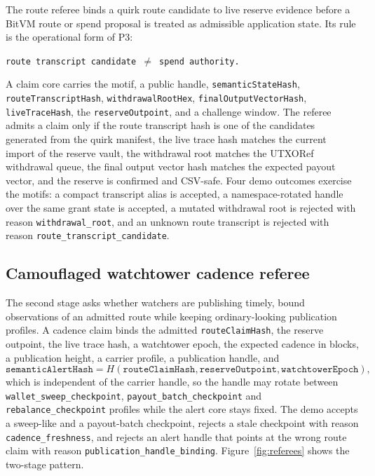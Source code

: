 \documentclass[11pt]{article}
\begin{document}
The route referee binds a quirk route candidate to live reserve evidence before
a BitVM route or spend proposal is treated as admissible application state. Its
rule is the operational form of P3:

\begin{center}
\texttt{route transcript candidate $\neq$ spend authority.}
\end{center}

A claim core carries the motif, a public handle, \texttt{semanticStateHash},
\texttt{routeTranscriptHash}, \texttt{withdrawalRootHex},
\texttt{finalOutputVectorHash}, \texttt{liveTraceHash}, the
\texttt{reserveOutpoint}, and a challenge window. The referee admits a claim
only if the route transcript hash is one of the candidates generated from the
quirk manifest, the live trace hash matches the current import of the reserve
vault, the withdrawal root matches the UTXORef withdrawal queue, the final output
vector hash matches the expected payout vector, and the reserve is confirmed and
CSV-safe. Four demo outcomes exercise the motifs: a compact transcript alias is
accepted, a namespace-rotated handle over the same grant state is accepted, a
mutated withdrawal root is rejected with reason \texttt{withdrawal\_root}, and
an unknown route transcript is rejected with reason
\texttt{route\_transcript\_candidate}.

\subsection{Camouflaged watchtower cadence referee}

The second stage asks whether watchers are publishing timely, bound
observations of an admitted route while keeping ordinary-looking publication
profiles. A cadence claim binds the admitted \texttt{routeClaimHash}, the
reserve outpoint, the live trace hash, a watchtower epoch, the expected cadence
in blocks, a publication height, a carrier profile, a publication handle, and
\[
\texttt{semanticAlertHash} = H(\texttt{routeClaimHash}, \texttt{reserveOutpoint}, \texttt{watchtowerEpoch}),
\]
which is independent of the carrier handle, so the handle may rotate between
\texttt{wallet\_sweep\_checkpoint}, \texttt{payout\_batch\_checkpoint} and
\texttt{rebalance\_checkpoint} profiles while the alert core stays fixed. The
demo accepts a sweep-like and a payout-batch checkpoint, rejects a stale
checkpoint with reason \texttt{cadence\_freshness}, and rejects an alert handle
that points at the wrong route claim with reason
\texttt{publication\_handle\_binding}. Figure~\ref{fig:referees} shows the
two-stage pattern.
\end{document}
